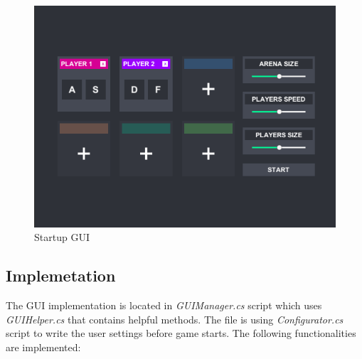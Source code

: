 \begin{figure}[h!] 
	\centering
	\includegraphics[width=\textwidth, frame]{gui-imgs/startupgui}
	\caption{Startup GUI}
\end{figure}


\subsection{Implemetation}\label{gui-implementation}
\indent The GUI implementation is located in \textit{GUIManager.cs} script which uses \textit{GUIHelper.cs} that contains helpful methods. The file is using \textit{Configurator.cs} script to write the user settings before game starts. The following functionalities are implemented:

